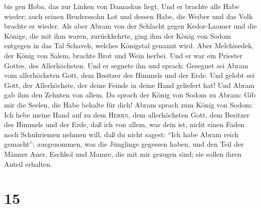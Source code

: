 bis gen Hoba, das zur Linken von Damaskus liegt.  Und er
brachte alle Habe wieder; auch seinen Bruderssohn Lot und dessen Habe,
die Weiber und das Volk brachte er wieder.  Als aber
Abram von der Schlacht gegen Kedor-Laomer und die Könige, die mit ihm
waren, zurückkehrte, ging ihm der König von Sodom entgegen in das Tal
Schaveh, welches Königstal genannt wird.  Aber
Melchisedek, der König von Salem, brachte Brot und Wein herbei. Und er
war ein Priester Gottes, des Allerhöchsten.  Und er
segnete ihn und sprach: Gesegnet sei Abram vom allerhöchsten Gott, dem
Besitzer des Himmels und der Erde.  Und gelobt sei Gott,
der Allerhöchste, der deine Feinde in deine Hand geliefert hat! Und
Abram gab ihm den Zehnten von allem.  Da sprach der König
von Sodom zu Abram: Gib mir die Seelen, die Habe behalte für dich!
 Abram sprach zum König von Sodom: Ich hebe meine Hand
auf zu dem \textsc{Herrn}, dem allerhöchsten Gott, dem Besitzer des
Himmels und der Erde,  daß ich von allem, was dein ist,
nicht einen Faden noch Schuhriemen nehmen will, daß du nicht sagest:
``Ich habe Abram reich gemacht'';  ausgenommen, was die
Jünglinge gegessen haben, und den Teil der Männer Aner, Eschkol und
Mamre, die mit mir gezogen sind; sie sollen ihren Anteil erhalten.

\hypertarget{section-14}{%
\section{15}\label{section-14}}

